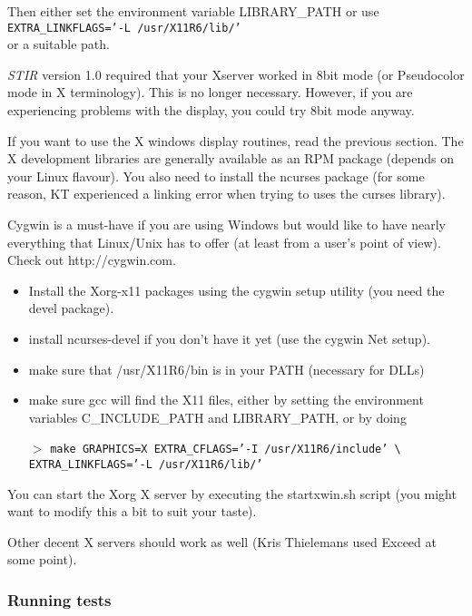 \documentclass{article}
\newcommand{\cmdline}[1]{\par \noindent $>$ \texttt{#1}\par}
\begin{document}
Then either set the environment variable LIBRARY\_PATH or use \\
\texttt{EXTRA\_LINKFLAGS='-L /usr/X11R6/lib/'}\\
 or a suitable path.


\textit{STIR} version 1.0 required that your Xserver worked in 8bit 
mode (or Pseudocolor mode in X terminology). This is no longer 
necessary. However, if you are experiencing problems with the 
display, you could try 8bit mode anyway.

{ 
}

If you want to use the X windows display routines, read the previous 
section. The X development libraries are generally available 
as an RPM package (depends on your Linux flavour). You also need 
to install the ncurses package (for some reason, KT experienced 
a linking error when trying to uses the curses library).

{ 
}

Cygwin is a must-have if you are using Windows but would like 
to have nearly everything that Linux/Unix has to offer (at least 
from a user's point of view). Check out http://cygwin.com.

{ 
}
\begin{itemize}
\item Install the Xorg-x11 packages using the cygwin setup utility 
(you need the devel package).
\item 
install ncurses-devel if you don't have it yet (use the cygwin 
Net setup).
\item make sure that /usr/X11R6/bin is in your PATH (necessary 
for DLLs)
\item
make sure gcc will find the X11 files, either by setting the 
environment variables C\_INCLUDE\_PATH and LIBRARY\_PATH, or by 
doing
\cmdline{make GRAPHICS=X EXTRA\_CFLAGS='-I /usr/X11R6/include' 
{\textbackslash} \\
EXTRA\_LINKFLAGS='-L 
/usr/X11R6/lib/'}
\end{itemize}

You can start the Xorg X server by executing the startxwin.sh 
script (you might want to modify this a bit to suit your taste). 



Other decent X servers should work as well (Kris Thielemans used Exceed at 
some point).


\subsubsection{
Running tests}
\end{document}
